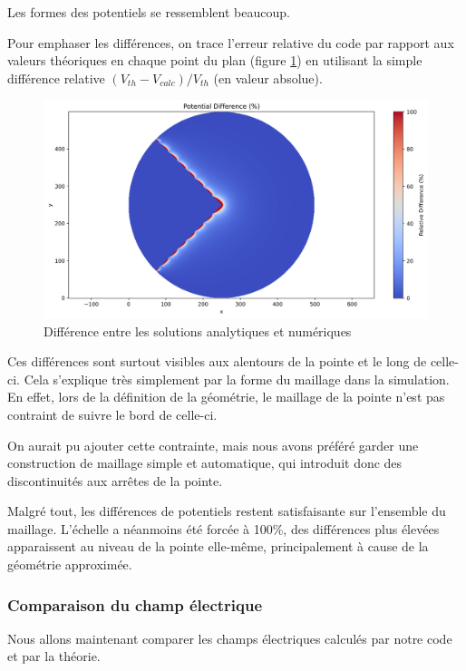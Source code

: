 \documentclass{article}
\begin{document}
Les formes des potentiels se ressemblent beaucoup.

Pour emphaser les différences, on trace l'erreur relative
du code par rapport aux valeurs théoriques en chaque point du plan
(figure \ref{fig:diff}) en utilisant la simple différence
relative $(V_{th} - V_{calc}) / V_{th}$ (en valeur absolue).

\begin{figure}[!h]
    \centering
    \includegraphics[width=\textwidth]{img/difference.png}
    \caption{Différence entre les solutions analytiques et numériques}
    \label{fig:diff}
\end{figure}

Ces différences sont surtout visibles aux alentours de la pointe
et le long de celle-ci. Cela s'explique très simplement par
la forme du maillage dans la simulation. En effet, lors de la
définition de la géométrie, le maillage de la pointe n'est pas
contraint de suivre le bord de celle-ci.

On aurait pu ajouter
cette contrainte, mais nous avons préféré garder une construction
de maillage simple et automatique, qui introduit donc des 
discontinuités aux arrêtes de la pointe.

Malgré tout, les différences de potentiels restent satisfaisante
sur l'ensemble du maillage. L'échelle a néanmoins
été forcée à 100\%, des différences plus élevées apparaissent au niveau
de la pointe elle-même, principalement à cause de la géométrie
approximée.

\newpage

\subsubsection{Comparaison du champ électrique}

Nous allons maintenant comparer les champs électriques
calculés par notre code et par la théorie.
\end{document}
